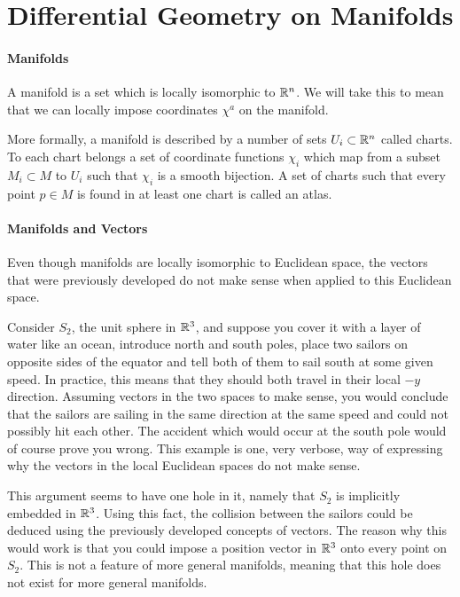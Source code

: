 \section{Differential Geometry on Manifolds}

\paragraph{Manifolds}
A manifold is a set which is locally isomorphic to $\mathbb{R}^{n}$. We will take this to mean that we can locally impose coordinates $\chi^{a}$ on the manifold.

More formally, a manifold is described by a number of sets $U_{i}\subset\mathbb{R}^{n}$ called charts. To each chart belongs a set of coordinate functions $\chi_{i}$ which map from a subset $M_{i}\subset M$ to $U_{i}$ such that $\chi_{i}$ is a smooth bijection. A set of charts such that every point $p\in M$ is found in at least one chart is called an atlas.

\paragraph{Manifolds and Vectors}
Even though manifolds are locally isomorphic to Euclidean space, the vectors that were previously developed do not make sense when applied to this Euclidean space.

Consider $S_{2}$, the unit sphere in $\mathbb{R}^{3}$, and suppose you cover it with a layer of water like an ocean, introduce north and south poles, place two sailors on opposite sides of the equator and tell both of them to sail south at some given speed. In practice, this means that they should both travel in their local $-y$ direction. Assuming vectors in the two spaces to make sense, you would conclude that the sailors are sailing in the same direction at the same speed and could not possibly hit each other. The accident which would occur at the south pole would of course prove you wrong. This example is one, very verbose, way of expressing why the vectors in the local Euclidean spaces do not make sense.

This argument seems to have one hole in it, namely that $S_{2}$ is implicitly embedded in $\mathbb{R}^{3}$. Using this fact, the collision between the sailors could be deduced using the previously developed concepts of vectors. The reason why this would work is that you could impose a position vector in $\mathbb{R}^{3}$ onto every point on $S_{2}$. This is not a feature of more general manifolds, meaning that this hole does not exist for more general manifolds.

